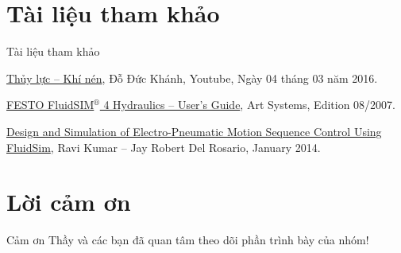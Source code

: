 \documentclass[24pt]{beamer}
\begin{document}
\section*{Tài liệu tham khảo}
\begin{frame}{Tài liệu tham khảo}
\begin{footnotesize}
\begin{enumerate}[{[1].}]
\justifying
\item \href{https://www.youtube.com/watch?v=VbrZZ7Jg09U&list=PLkemUmoYKlGwmuG1mLVB_VnRhW-h57giK}{Thủy lực -- Khí nén}, Đỗ Đức Khánh, Youtube, Ngày 04 tháng 03 năm 2016.

\item \href{https://www.art-systems.de/fluidsim/download/v4/hb-eng-h4.pdf}{FESTO FluidSIM$^\circledR$ 4 Hydraulics -- User’s Guide}, Art Systems, 
Edition 08/2007.

\item \href{https://www.researchgate.net/publication/278154968_Design_and_Simulation_of_Electro-Pneumatic_Motion_Sequence_Control_Using_FluidSim}{Design and Simulation of Electro-Pneumatic Motion Sequence Control Using FluidSim}, Ravi Kumar -- Jay Robert Del Rosario, January 2014.
\end{enumerate}
\end{footnotesize}
\end{frame}
\section*{Lời cảm ơn}
\begin{frame}
\justifying
\large \alert{Cảm ơn Thầy và các bạn đã quan tâm theo dõi phần trình bày của nhóm!}
\end{frame}
\end{document}
